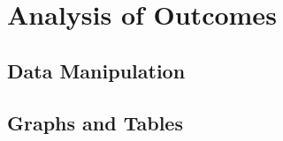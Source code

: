 \section{Analysis of Outcomes}
\label{sec:outcome} 
\subsection{Data Manipulation}
\subsection{Graphs and Tables}